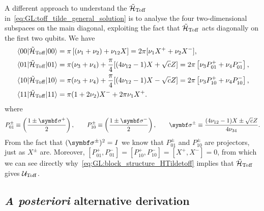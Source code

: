 A different approach to understand the $\tilde{{\mathcal{H}}}_{\operatorname{Toff}}$ in~\cref{eq:GL:toff_tilde_general_solution} is to analyse the four two-dimensional subspaces on the main diagonal, exploiting the fact that $\tilde{{\mathcal{H}}}_{\operatorname{Toff}}$ acts diagonally on the first two qubits.
We have
\begin{equation}
\begin{aligned}
	\mel{00}{\tilde{{\mathcal{H}}}_{\operatorname{Toff}}}{00} &=
    \pi \left[(\nu_1+\nu_2)+\nu_{12} X\right] =
    2\pi[\nu_1 X^+ + \nu_2 X^-], \\
	\mel{01}{\tilde{{\mathcal{H}}}_{\operatorname{Toff}}}{01} &=
    \pi(\nu_3+\nu_4) + \frac{\pi}{4}[(4\nu_{12}-1) X + \sqrt{c} Z] =
    2\pi\left[\nu_3 P_{01}^+ + \nu_4 P_{01}^-\right], \\
	\mel{10}{\tilde{{\mathcal{H}}}_{\operatorname{Toff}}}{10} &=
    \pi(\nu_3+\nu_4) + \frac{\pi}{4}[(4\nu_{12}-1) X - \sqrt{c} Z] =
    2\pi\left[\nu_3 P_{10}^+ + \nu_4 P_{10}^-\right], \\
	\mel{11}{\tilde{{\mathcal{H}}}_{\operatorname{Toff}}}{11} &=
    \pi(1 + 2\nu_2) X^- + 2\pi \nu_1 X^+.
\end{aligned}
\label{eq:GL:block_structure_HTildetoff}
\end{equation}
where
\begin{equation}
    P_{01}^\pm \equiv \left(\frac{1\pm\bs\sigma^+}{2}\right), \qquad
    P_{10}^\pm \equiv \left(\frac{1\pm\bs\sigma^-}{2}\right), \qquad
    \bs\sigma^\pm \equiv \frac{(4\nu_{12}-1)X\pm\sqrt c Z}{4\nu_{34}}.
\end{equation}
From the fact that $(\bs\sigma^\pm)^2=I$ we know that $P_{01}^\pm$ and $P_{10}^\pm$ are projectors, just as $X^\pm$ are. Moreover, $[P_{01}^+,P_{01}^-]=[P_{10}^+,P_{10}^-]=[X^+,X^-]=0$, from which we can see directly why~\cref{eq:GL:block_structure_HTildetoff} implies that $\tilde{{\mathcal{H}}}_{\operatorname{Toff}}$ gives ${\mathcal{U}}_{\operatorname{Toff}}$.


\subsection{\textit{A posteriori} alternative derivation \ccheck}
\label{subsec:GL:toffoli_posteriori_derivation}

